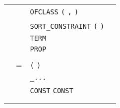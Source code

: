\begin{isabellebody}
\begin{isamarkuptext}
\begin{center}
\begin{supertabular}{rclr}
    & \isa{{\isachardoublequote}{\isacharbar}{\isachardoublequote}} & \verb|OFCLASS| \verb|(|  \verb|,|  \verb|)| \\
    & \isa{{\isachardoublequote}{\isacharbar}{\isachardoublequote}} & \verb|SORT_CONSTRAINT| \verb|(|  \verb|)| \\
    & \isa{{\isachardoublequote}{\isacharbar}{\isachardoublequote}} & \verb|TERM|  \\
    & \isa{{\isachardoublequote}{\isacharbar}{\isachardoublequote}} & \verb|PROP|  \\\\

  \hypertarget{syntax.inner.aprop}{\hyperlink{syntax.inner.aprop}{\mbox{}}} & = & \verb|(|  \verb|)| \\
    & \isa{{\isachardoublequote}{\isacharbar}{\isachardoublequote}} & \verb|_|\isa{{\isachardoublequote}\ \ {\isacharbar}\ \ {\isachardoublequote}}\verb|...| \\
    & \isa{{\isachardoublequote}{\isacharbar}{\isachardoublequote}} & \verb|CONST| \verb|CONST|  \\
    & \isa{{\isachardoublequote}{\isacharbar}{\isachardoublequote}} &  &  \\\\


\end{supertabular}
\end{center}
\end{isamarkuptext}
\end{isabellebody}
